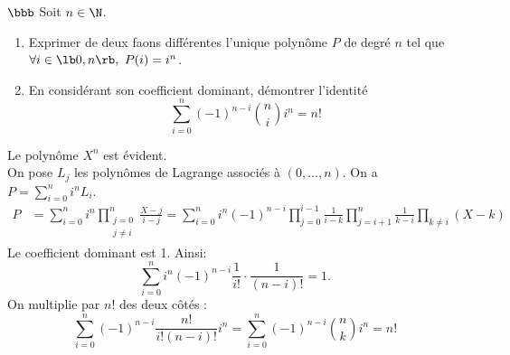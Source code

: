 \documentclass[11pt]{article}
\begin{document}
\pagebreak

\begin{exercice}{$\bbb$}{}
    Soit $n\in\N$.
    \begin{enumerate}
        \item Exprimer de deux faons différentes l'unique polynôme $P$ de degré $n$ tel que $\forall i \in \lb0,n\rb, ~ P(i)=i^n$.
        \item En considérant son coefficient dominant, démontrer l'identité
        \begin{equation*}
            \sum_{i=0}^n(-1)^{n-i}\binom{n}{i}i^n=n!
        \end{equation*}
    \end{enumerate}
    \tcblower
     Le polynôme $X^n$ est évident.\\
    On pose $L_j$ les polynômes de Lagrange associés à $(0,...,n)$. On a $P=\sum_{i=0}^ni^nL_i$.
    \begin{align*}
        P&=\sum_{i=0}^ni^n\prod_{\substack{j=0\\j\neq i}}^n\frac{X-j}{i-j}=\sum_{i=0}^ni^n(-1)^{n-i}\prod_{j=0}^{i-1}\frac{1}{i-k}\prod_{j=i+1}^n\frac{1}{k-i}\prod_{k\neq i}(X-k)
    \end{align*}
     Le coefficient dominant est 1. Ainsi:
    \begin{equation*}
        \sum_{i=0}^ni^n(-1)^{n-i}\frac{1}{i!}\cdot\frac{1}{(n-i)!}=1.
    \end{equation*}
    On multiplie par $n!$ des deux côtés :
    \begin{equation*}
        \sum_{i=0}^n(-1)^{n-i}\frac{n!}{i!(n-i)!}i^n=\sum_{i=0}^n(-1)^{n-i}\binom{n}{k}i^n=n!
    \end{equation*}
\end{exercice}
\end{document}
